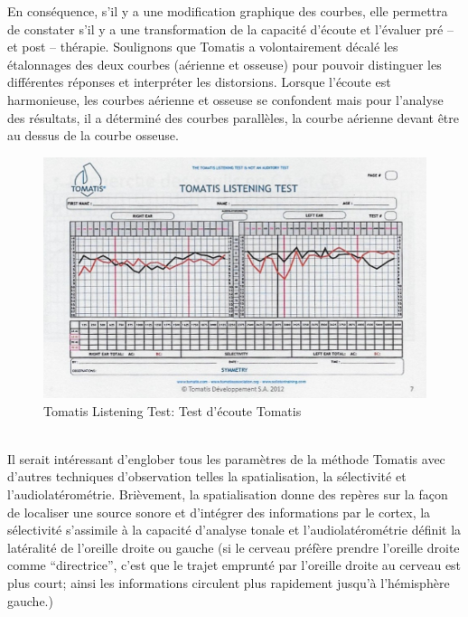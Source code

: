  En  conséquence,  s'il y a une modification
          graphique des courbes, elle
          permettra de constater s'il y a une transformation de la capacité d'écoute
          et l'évaluer pré -- et
          post -- thérapie.
Soulignons que Tomatis a volontairement décalé les étalonnages des deux courbes (aérienne et 
osseuse) pour pouvoir distinguer les différentes réponses et interpréter
	les distorsions. Lorsque l'écoute est harmonieuse, les
	courbes aérienne et osseuse se confondent mais pour l'analyse des
	résultats, il a déterminé des courbes parallèles, la courbe aérienne
	devant être au dessus de la courbe osseuse.
\begin{figure}
	\centering
	\includegraphics[width=0.8\linewidth]{images/tomatisListeningTest.jpg}
	\caption[Test d'écoute]{Tomatis Listening Test: Test
          d'écoute Tomatis}
	\label{Test d'écoute asymétrique avec oreille droite et oreille gauche}
\end{figure}
\\
 Il serait intéressant d'englober tous les paramètres de la méthode Tomatis 
 avec d'autres techniques 
 d'observation telles la spatialisation, la sélectivité et l'audiolatérométrie. 
 Brièvement, la spatialisation donne des repères sur la façon de localiser une source sonore et d'intégrer 
 des informations par le cortex, la sélectivité s'assimile à la capacité d'analyse tonale %
 et l'audiolatérométrie définit la latéralité de l'oreille droite ou gauche (si le cerveau préfère prendre 
 l'oreille droite comme ``directrice'', c'est que le trajet emprunté par l'oreille droite au cerveau est plus 
 court; ainsi les informations circulent plus rapidement jusqu'à l'hémisphère gauche.)
